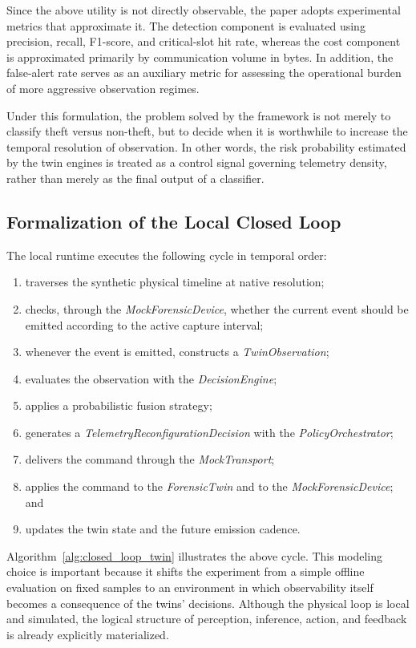 \documentclass[journal]{IEEEtran}
\begin{document}
Since the above utility is not directly observable, the paper adopts experimental metrics that approximate it. The detection component is evaluated using precision, recall, F1-score, and critical-slot hit rate, whereas the cost component is approximated primarily by communication volume in bytes. In addition, the false-alert rate serves as an auxiliary metric for assessing the operational burden of more aggressive observation regimes.

Under this formulation, the problem solved by the framework is not merely to classify theft versus non-theft, but to decide when it is worthwhile to increase the temporal resolution of observation. In other words, the risk probability estimated by the twin engines is treated as a control signal governing telemetry density, rather than merely as the final output of a classifier.


\subsection{Formalization of the Local Closed Loop}
The local runtime executes the following cycle in temporal order:

\begin{enumerate}
    \item traverses the synthetic physical timeline at native resolution;
    \item checks, through the \textit{MockForensicDevice}, whether the current event should be emitted according to the active capture interval;
    \item whenever the event is emitted, constructs a \textit{TwinObservation};
    \item evaluates the observation with the \textit{DecisionEngine};
    \item applies a probabilistic fusion strategy;
    \item generates a \textit{TelemetryReconfigurationDecision} with the \textit{PolicyOrchestrator};
    \item delivers the command through the \textit{MockTransport};
    \item applies the command to the \textit{ForensicTwin} and to the \textit{MockForensicDevice}; and
    \item updates the twin state and the future emission cadence.
\end{enumerate}

Algorithm~\ref{alg:closed_loop_twin} illustrates the above cycle. This modeling choice is important because it shifts the experiment from a simple offline evaluation on fixed samples to an environment in which observability itself becomes a consequence of the twins' decisions. Although the physical loop is local and simulated, the logical structure of perception, inference, action, and feedback is already explicitly materialized.
\end{document}
